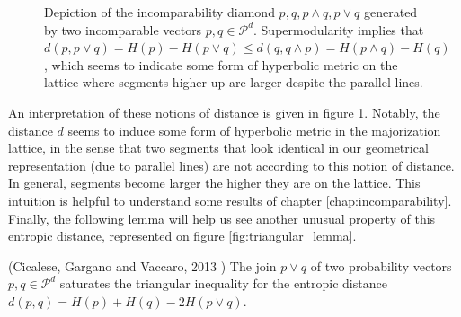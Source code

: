 \begin{figure}[h!]
    \centering
    \caption{Depiction of the incomparability diamond $p, q, p \wedge q, p \vee q$ generated by two incomparable vectors $p, q \in \mathcal{P}^d$. Supermodularity implies that $d(p, p\vee q) = H(p) - H(p \vee q) \leq d(q, q \wedge p) = H(p \wedge q) - H(q)$, which seems to indicate some form of hyperbolic metric on the lattice where segments higher up are larger despite the parallel lines.} 
    \label{fig:hyperbolic_geometry}
\end{figure}

An interpretation of these notions of distance is given in figure \ref{fig:hyperbolic_geometry}. Notably, the distance $d$ seems to induce some form of hyperbolic metric in the majorization lattice, in the sense that two segments that look identical in our geometrical representation (due to parallel lines) are not according to this notion of distance. In general, segments become larger the higher they are on the lattice. This intuition is helpful to understand some results of chapter \ref{chap:incomparability}. Finally, the following lemma will help us see another unusual property of this entropic distance, represented on figure \ref{fig:triangular_lemma}.

\begin{lemma} (Cicalese, Gargano and Vaccaro, 2013 \cite{cicalese_information_2013}) \label{lem:comp_future} 
    The join $p \vee q$ of two probability vectors $p, q \in \mathcal{P}^d$ saturates the triangular inequality for the entropic distance $d(p, q) = H(p) + H(q) - 2H(p \vee q)$.
\end{lemma}

